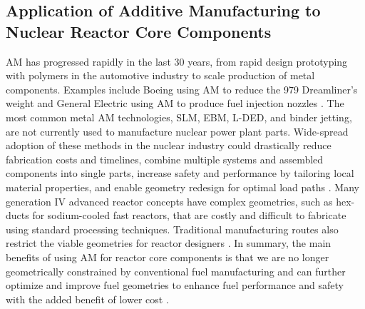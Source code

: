 \subsection{Application of Additive Manufacturing to Nuclear Reactor Core Components}
\label{sec:am}
\gls{AM} has progressed rapidly in the last 30 years, from rapid design prototyping 
with polymers in the automotive industry to scale production of metal components.  
Examples include Boeing using \gls{AM} to reduce the 979 Dreamliner's weight 
\cite{noauthor_printed_2017} and General Electric using \gls{AM} to produce fuel 
injection nozzles \cite{noauthor_transformation_2018}. 
The most common metal \gls{AM} technologies, \gls{SLM}, \gls{EBM}, \gls{L-DED}, 
and binder jetting, are not currently used to manufacture nuclear power plant parts. 
Wide-spread adoption of these methods in the nuclear industry could drastically 
reduce fabrication costs and timelines, combine multiple systems and assembled 
components into single parts, increase safety and performance by tailoring 
local material properties, and enable geometry redesign for optimal load paths 
\cite{simpson_considerations_2019}. 
Many generation IV advanced reactor concepts have complex geometries, 
such as hex-ducts for sodium-cooled fast reactors, that are costly and difficult 
to fabricate using standard processing techniques. 
Traditional manufacturing routes also restrict the viable geometries for 
reactor designers \cite{sridharan_performance_2019}. 
In summary, the main benefits of using \gls{AM} for reactor core components is that 
we are no longer geometrically constrained by conventional fuel manufacturing 
and can further optimize and improve fuel geometries to enhance fuel performance and 
safety with the added benefit of lower cost \cite{bergeron_early_2018}. 

